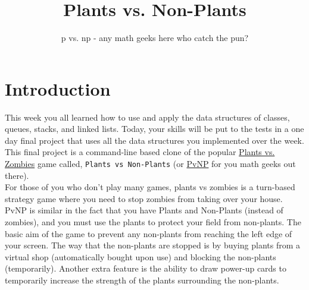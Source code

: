 \documentclass{42-en}
\begin{document}
                           \title{Plants vs. Non-Plants}
                          \subtitle{p vs. np - any math geeks here who catch the pun?}


\maketitle

\tableofcontents

\chapter{Introduction}
	
This week you all learned how to use and apply the data structures of classes, queues, stacks, and linked lists. Today, your skills will be put to the tests in a one day final project that uses all the data structures you implemented over the week.\\

This final project is a command-line based clone of the popular \href{https://en.wikipedia.org/wiki/Plants_vs._Zombies}{Plants vs. Zombies} game called, \texttt{Plants vs Non-Plants} (or \href{https://en.wikipedia.org/wiki/P_versus_NP_problem}{PvNP} for you math geeks out there).\\

For those of you who don't play many games, plants vs zombies is a turn-based strategy game where you need to stop zombies from taking over your house. 
PvNP is similar in the fact that you have Plants and Non-Plants (instead of zombies), and you must use the plants to protect your field from non-plants. 
The basic aim of the game to prevent any non-plants from reaching the left edge of your screen. The way that the non-plants are stopped is by buying plants from a virtual shop (automatically bought upon use) and blocking the non-plants (temporarily). Another extra feature is the ability to draw power-up cards to temporarily increase the strength of the plants surrounding the non-plants.
\end{document}
